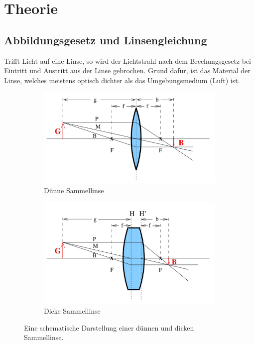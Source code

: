 \section{Theorie}
\label{sec:Theorie}
\subsection{Abbildungsgesetz und Linsengleichung}
Trifft Licht auf eine Linse, so wird der Lichtstrahl nach dem Brechungsgesetz bei Eintritt und Austritt aus der Linse gebrochen.
Grund dafür, ist das Material der Linse, welches meistens optisch dichter als das Umgebungsmedium (Luft) ist.
\begin{figure}
\centering
\begin{subfigure}{0.48\textwidth}
    \centering
    \includegraphics[width=0.9\linewidth]{content/data/sammellinse_duenn.jpg}
    \caption{Dünne Sammellinse}
    \label{fig:sammellinse_duenn}
\end{subfigure}
\begin{subfigure}{0.48\textwidth}
    \centering
    \includegraphics[width=0.9\linewidth]{content/data/sammellinse_dick.jpg}
    \caption{Dicke Sammellinse}
    \label{fig:sammellinse_dick}
\end{subfigure}
\caption{Eine schematische Darstellung einer dünnen und dicken Sammellinse. \cite[1]{anleitung}}
\label{fig:sammellinse}
\end{figure}

